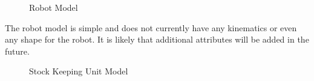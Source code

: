 \begin{flushleft}
\end{flushleft}
\begin{figure}[h]
\caption{Robot Model}
\label{fig:Robot}
\end{figure}

The robot model is simple and does not currently have any kinematics or
even any shape for the robot. It is likely that additional attributes will
be added in the future.

\begin{flushleft}
\end{flushleft}
\begin{figure}[h]
\caption{Stock Keeping Unit Model}
\label{fig:SKU}
\end{figure}

